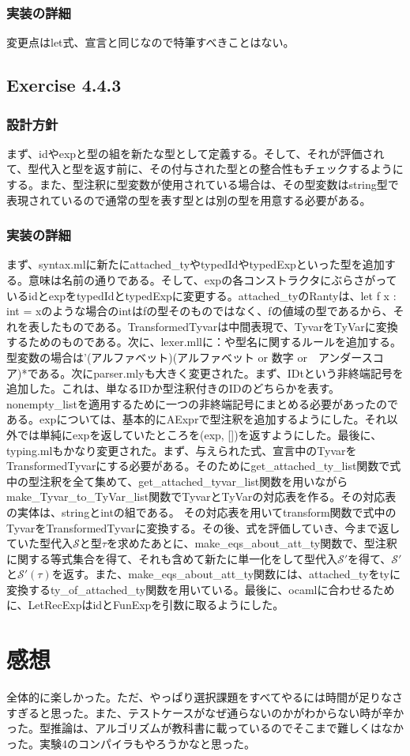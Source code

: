 \documentclass{jarticle}
\begin{document}
\subsubsection{実装の詳細}
変更点はlet式、宣言と同じなので特筆すべきことはない。

\subsection{Exercise 4.4.3}
\subsubsection{設計方針}
まず、idやexpと型の組を新たな型として定義する。そして、それが評価されて、型代入と型を返す前に、その付与された型との整合性もチェックするようにする。また、型注釈に型変数が使用されている場合は、その型変数はstring型で表現されているので通常の型を表す型とは別の型を用意する必要がある。
\subsubsection{実装の詳細}
まず、syntax.mlに新たにattached\_tyやtypedIdやtypedExpといった型を追加する。意味は名前の通りである。そして、expの各コンストラクタにぶらさがっているidとexpをtypedIdとtypedExpに変更する。attached\_tyのRantyは、let f x : int = xのような場合のintはfの型そのものではなく、fの値域の型であるから、それを表したものである。TransformedTyvarは中間表現で、TyvarをTyVarに変換するためのものである。次に、lexer.mllに：や型名に関するルールを追加する。型変数の場合は'(アルファベット)(アルファベット or 数字 or　アンダースコア)*である。次にparser.mlyも大きく変更された。まず、IDtという非終端記号を追加した。これは、単なるIDか型注釈付きのIDのどちらかを表す。nonempty\_listを適用するために一つの非終端記号にまとめる必要があったのである。expについては、基本的にAExprで型注釈を追加するようにした。それ以外では単純にexpを返していたところを(exp, [])を返すようにした。最後に、typing.mlもかなり変更された。まず、与えられた式、宣言中のTyvarをTransformedTyvarにする必要がある。そのためにget\_attached\_ty\_list関数で式中の型注釈を全て集めて、get\_attached\_tyvar\_list関数を用いながらmake\_Tyvar\_to\_TyVar\_list関数でTyvarとTyVarの対応表を作る。その対応表の実体は、stringとintの組である。
その対応表を用いてtransform関数で式中のTyvarをTransformedTyvarに変換する。その後、式を評価していき、今まで返していた型代入$\mathcal{S}$と型$\tau$を求めたあとに、make\_eqs\_about\_att\_ty関数で、型注釈に関する等式集合を得て、それも含めて新たに単一化をして型代入$\mathcal{S}'$を得て、$\mathcal{S}'$と$\mathcal{S}'(\tau)$を返す。また、make\_eqs\_about\_att\_ty関数には、attached\_tyをtyに変換するty\_of\_attached\_ty関数を用いている。最後に、ocamlに合わせるために、LetRecExpはidとFunExpを引数に取るようにした。

\section{感想}
全体的に楽しかった。ただ、やっぱり選択課題をすべてやるには時間が足りなさすぎると思った。また、テストケースがなぜ通らないのかがわからない時が辛かった。型推論は、アルゴリズムが教科書に載っているのでそこまで難しくはなかった。実験4のコンパイラもやろうかなと思った。
\end{document}
